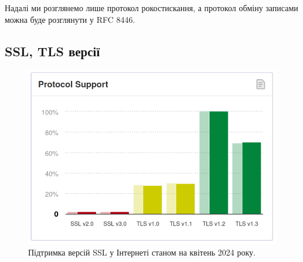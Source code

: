 Надалі ми розглянемо лише протокол рокостискання, а протокол обміну записами можна буде розглянути у RFC 8446.

\subsection{SSL, TLS версії}

\begin{figure}[ht]
        \centering
        \includegraphics[scale=0.35]{../IMAGES/ssl_support.png}
        \caption{Підтримка версій SSL у Інтернеті станом на квітень 2024 року.}
        \label{ssl_support}
\end{figure}

